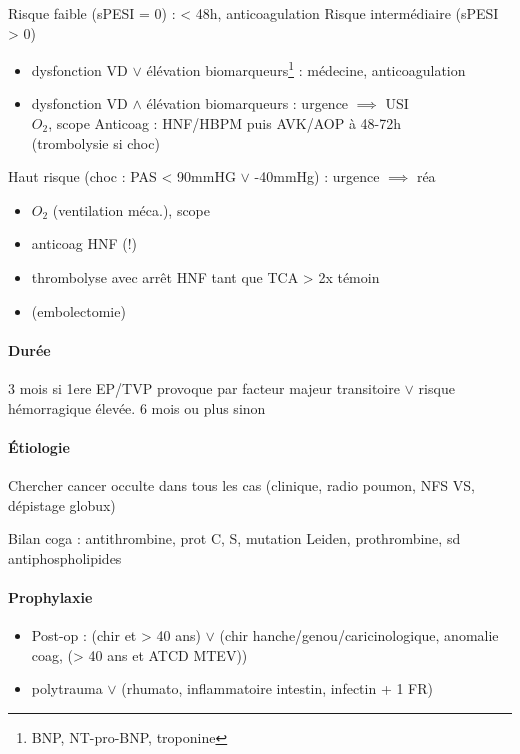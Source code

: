 \documentclass{article}
\newcommand*{\TakeFourierOrnament}[1]{{%
\fontencoding{U}\fontfamily{futs}\selectfont\char#1}}
\newcommand*{\danger}{\TakeFourierOrnament{66}}
\begin{document}
Risque faible (sPESI = 0) : \faHospitalO{} < 48h, anticoagulation
Risque intermédiaire (sPESI > 0)
\begin{itemize}
  \item dysfonction VD $\vee$ élévation biomarqueurs\footnote{BNP, NT-pro-BNP,
      troponine} : \faHospitalO{}
    médecine, anticoagulation
  \item dysfonction VD $\wedge$ élévation biomarqueurs : urgence \danger{}
    $\implies$ USI\\
    $O_2$, scope
    Anticoag : HNF/HBPM puis AVK/AOP à 48-72h\\
    (trombolysie si choc)
\end{itemize}
Haut risque (choc : PAS < 90mmHG $\vee$ -40mmHg) : urgence \skull $\implies$ réa
\begin{itemize}
  \item $O_2$ (ventilation méca.), scope
  \item anticoag HNF (!)
  \item thrombolyse avec arrêt HNF tant que TCA > 2x témoin
  \item (embolectomie)
\end{itemize}

\paragraph{Durée}
3 mois si 1ere EP/TVP provoque par facteur majeur transitoire $\vee$ risque
hémorragique élevée. 6 mois ou plus sinon

\paragraph{Étiologie}
Chercher cancer occulte dans tous les cas (clinique, radio poumon, NFS VS,
dépistage globux)

Bilan coga : {antithrombine, prot C, S}, mutation {Leiden, prothrombine}, sd
antiphospholipides

\paragraph{Prophylaxie}
\begin{itemize}
  \item Post-op : (chir et > 40 ans) $\vee$ (chir hanche/genou/caricinologique, anomalie
coag, (> 40 ans et ATCD MTEV))
  \item polytrauma $\vee$ ({rhumato, inflammatoire intestin, infectin} + 1 FR)

\end{itemize}
\end{document}
